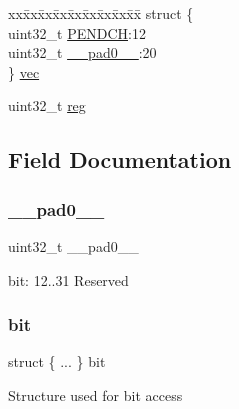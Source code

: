 \begin{DoxyCompactItemize}
\begin{tabbing}
\end{tabbing}\item 
\begin{tabbing}
xx\=xx\=xx\=xx\=xx\=xx\=xx\=xx\=xx\=\kill
struct \{\\
\>uint32\_t \mbox{\hyperlink{union_d_m_a_c___p_e_n_d_c_h___type_a9c9f43fcb6dbd50759ad32e877bf25b8}{PENDCH}}:12\\
\>uint32\_t \mbox{\hyperlink{union_d_m_a_c___p_e_n_d_c_h___type_a3e57c2ef1c3ffb36722f000cc1156824}{\_\_pad0\_\_}}:20\\
\} \mbox{\hyperlink{union_d_m_a_c___p_e_n_d_c_h___type_a7cb87177144b4bccfc63be701cd19127}{vec}}\\

\end{tabbing}\item 
uint32\+\_\+t \mbox{\hyperlink{union_d_m_a_c___p_e_n_d_c_h___type_a6b91636401516a477989a336376d7b40}{reg}}
\end{DoxyCompactItemize}


\subsection{Field Documentation}
\mbox{\label{union_d_m_a_c___p_e_n_d_c_h___type_a3e57c2ef1c3ffb36722f000cc1156824}} 
\subsubsection{\texorpdfstring{\_\_pad0\_\_}{\_\_pad0\_\_}}
{\footnotesize\ttfamily uint32\+\_\+t \+\_\+\+\_\+pad0\+\_\+\+\_\+}

bit\+: 12..31 Reserved \mbox{\label{union_d_m_a_c___p_e_n_d_c_h___type_a150c646ea14d8d0288c0a9b5ae1c17c2}} 
\subsubsection{\texorpdfstring{bit}{bit}}
{\footnotesize\ttfamily struct \{ ... \}   bit}

Structure used for bit access \mbox{\label{union_d_m_a_c___p_e_n_d_c_h___type_a9c9f43fcb6dbd50759ad32e877bf25b8}} 
